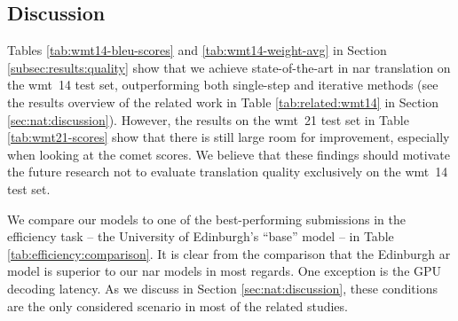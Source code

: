 \subsection{Discussion}%
\label{subsec:results:discussion}

Tables \ref{tab:wmt14-bleu-scores} and \ref{tab:wmt14-weight-avg} in Section
\ref{subsec:results:quality} show that we achieve state-of-the-art in \acl{nar}
translation on the \acs{wmt}~14 test set, outperforming both single-step and
iterative methods (see the results overview of the related work in Table
\ref{tab:related:wmt14} in Section \ref{sec:nat:discussion}). However, the
results on the \acs{wmt}~21 test set in Table \ref{tab:wmt21-scores} show that
there is still large room for improvement, especially when looking at the
\acs{comet} scores. We believe that these findings should motivate the future
research not to evaluate translation quality exclusively on the \acs{wmt}~14
test set.

We compare our models to one of the best-performing submissions in the
efficiency task -- the University of Edinburgh's ``base'' model
\citep{Behnke-wmt21-speed} -- in Table \ref{tab:efficiency:comparison}. It is
clear from the comparison that the Edinburgh \acl{ar} model is superior to our
\ac{nar} models in most regards. One exception is the GPU decoding latency. As
we discuss in Section \ref{sec:nat:discussion}, these conditions are the only
considered scenario in most of the related studies.

